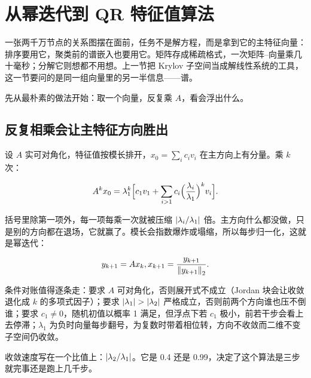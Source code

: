 \section{从幂迭代到 QR 特征值算法}
\label{sec:08-Numerical-Analysis/05-Numerical-Linear-Algebra/05}

一张两千万节点的关系图摆在面前，任务不是解方程，而是拿到它的主特征向量：排序要用它，聚类前的谱嵌入也要用它。矩阵存成稀疏格式，一次矩阵--向量乘几十毫秒；分解它则想都不用想。上一节把 Krylov 子空间当成解线性系统的工具，这一节要问的是同一组向量里的另一半信息——谱。

先从最朴素的做法开始：取一个向量，反复乘 \(A\)，看会浮出什么。

\subsection{反复相乘会让主特征方向胜出}

设 \(A\) 实可对角化，特征值按模长排开，\(x_0=\sum_i c_i v_i\) 在主方向上有分量。乘 \(k\) 次：

\[
A^kx_0=\lambda_1^k\Bigl[c_1v_1+\sum_{i>1}c_i\Bigl(\frac{\lambda_i}{\lambda_1}\Bigr)^{k}v_i\Bigr].
\]

括号里除第一项外，每一项每乘一次就被压缩 \(\left|\lambda_i/\lambda_1\right|\) 倍。主方向什么都没做，只是别的方向都在退场，它就赢了。模长会指数爆炸或塌缩，所以每步归一化，这就是幂迭代：

\[
y_{k+1}=Ax_k,\space x_{k+1}=\frac{y_{k+1}}{\left\lVert y_{k+1}\right\rVert_2}.
\]

条件对账值得逐条走：要求 \(A\) 可对角化，否则展开式不成立（Jordan 块会让收敛退化成 \(k\) 的多项式因子）；要求 \(\abs{\lambda_1}>\abs{\lambda_2}\) 严格成立，否则前两个方向谁也压不倒谁；要求 \(c_1\neq0\)，随机初值以概率 1 满足，但浮点下若 \(c_1\) 极小，前若干步会看上去停滞；\(\lambda_1\) 为负时向量每步翻号，为复数时带着相位转，方向不收敛而二维不变子空间仍收敛。

收敛速度写在一个比值上：\(\left|\lambda_2/\lambda_1\right|\)。它是 0.4 还是 0.99，决定了这个算法是三步就完事还是跑上几千步。

